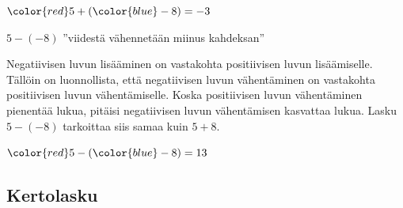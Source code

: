     \begin{center}
                 \begin{lukusuora}{-4}{8}{14}
        {\color{blue} }
        \lukusuorauusi
        {\color{red} }
       \end{lukusuora}
       ${\color{red}5}+({\color{blue}-8})=-3$
    \end{center}
    
    
    $5-(-8)$ ''viidestä vähennetään miinus kahdeksan''
    
    Negatiivisen luvun lisääminen on vastakohta positiivisen luvun lisäämiselle. Tällöin on luonnollista, että negatiivisen luvun vähentäminen on vastakohta positiivisen luvun vähentämiselle. Koska positiivisen luvun vähentäminen pienentää lukua, pitäisi negatiivisen luvun vähentämisen kasvattaa lukua. Lasku $5-(-8)$ tarkoittaa siis samaa kuin $5+8$.
    
\vspace{0.3cm}     
        
    \begin{center}
    \begin{lukusuora}{-1}{14}{14}
        {\color{red} }
        \lukusuorauusi
        {\color{red} }
        {\color{blue} }
       \end{lukusuora}
       ${\color{red}5}-({\color{blue}-8})=13$
    \end{center}



%



\subsection*{Kertolasku}

